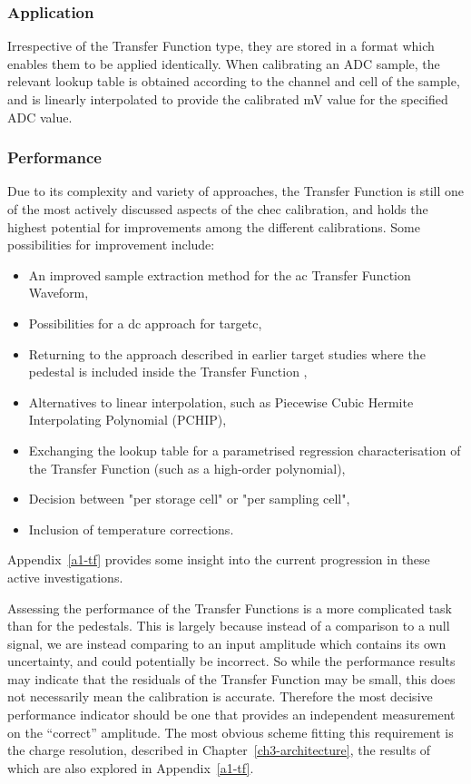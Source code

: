 \subsubsection{Application}

Irrespective of the Transfer Function type, they are stored in a format which enables them to be applied identically. When calibrating an ADC sample, the relevant lookup table is obtained according to the channel and cell of the sample, and is linearly interpolated to provide the calibrated mV value for the specified ADC value.

\subsubsection{Performance}

Due to its complexity and variety of approaches, the Transfer Function is still one of the most actively discussed aspects of the \gls{chec} calibration, and holds the highest potential for improvements among the different calibrations. Some possibilities for improvement include:
\begin{itemize}
	\item An improved sample extraction method for the \gls{ac} Transfer Function Waveform,
	\item Possibilities for a \gls{dc} approach for \gls{targetc},
	\item Returning to the approach described in earlier \gls{target} studies where the pedestal is included inside the Transfer Function \cite{Albert2017},
	\item Alternatives to linear interpolation, such as Piecewise Cubic Hermite Interpolating Polynomial (PCHIP),
	\item Exchanging the lookup table for a parametrised regression characterisation of the Transfer Function (such as a high-order polynomial),
	\item Decision between "per storage cell" or "per sampling cell",
	\item Inclusion of temperature corrections.
\end{itemize}
Appendix~\ref{a1-tf} provides some insight into the current progression in these active investigations.

Assessing the performance of the Transfer Functions is a more complicated task than for the pedestals. This is largely because instead of a comparison to a null signal, we are instead comparing to an input amplitude which contains its own uncertainty, and could potentially be incorrect. So while the performance results may indicate that the residuals of the Transfer Function may be small, this does not necessarily mean the calibration is accurate. Therefore the most decisive performance indicator should be one that provides an independent measurement on the ``correct'' amplitude. The most obvious scheme fitting this requirement is the charge resolution, described in Chapter~\ref{ch3-architecture}, the results of which are also explored in Appendix~\ref{a1-tf}.

